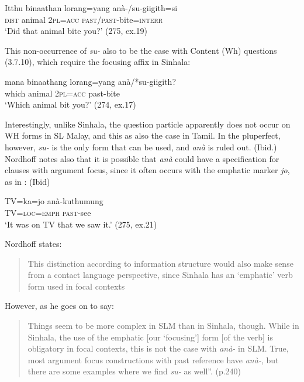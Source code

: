 \ea\label{ex3.7.9} 
\gll   Itthu binaathan lorang=yang  anà-/su-giigith=si\\
  \textsc{dist} animal 2\textsc{pl}=\textsc{acc} \textsc{past}/\textsc{past}-bite=\textsc{interr}\\
  `Did that animal bite you?' (275, ex.19)
\z


This non-occurrence of \textit{su-} also to be the case with Content (Wh) questions (3.7.10), which require the focusing affix in Sinhala:


\ea\label{ex3.7.10} 
\gll  mana binaathang lorang=yang anà/*su-giigith?\\
  which animal 2\textsc{pl}=\textsc{acc} past-bite\\
  `Which animal bit you?' (274, ex.17)\footnotemark
\z
{}

 Interestingly, unlike Sinhala, the question particle apparently does not occur on WH forms in SL Malay, and this as also the case in Tamil.
  In the pluperfect, however, \textit{su-} is the only form that can be used, and \textit{anà }is ruled out. (Ibid.)
Nordhoff notes also that it is possible that \textit{anà }could have a specification for clauses with argument focus, since it often occurs with the emphatic marker \textit{jo}, as in : (Ibid)
 

\ea\label{ex3.7.11}
\gll TV=ka=jo anà-kuthumung\\
  TV=\textsc{loc}=\textsc{emph} \textsc{past}-see\\
  `It was on \textsc{TV} that we saw it.' (275, ex.21)
\z


Nordhoff states:
\begin{quote}
 This distinction according to information structure would also make sense from a contact language perspective, since Sinhala has an `emphatic' verb form used in focal contexts \citep{Gair1985calque}
 \end{quote}
 However, as he goes on to say:
\begin{quote}
 Things seem to be more complex in SLM than in Sinhala, though. While in Sinhala, the use of the emphatic [our `focusing'] form [of the verb] is obligatory in focal contexts, this is not the case with \textit{anà-} in SLM. True, most argument focus constructions with past reference have \textit{anà-}, but there are some examples where we find \textit{su-} as well''. (p.240)
\end{quote}

